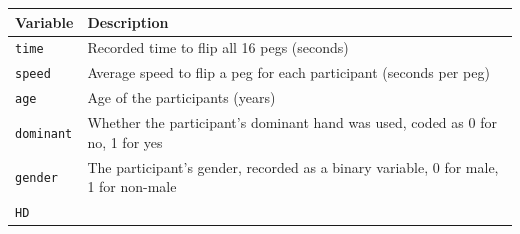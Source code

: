 \documentclass[
]{report}
\begin{document}
\begin{longtable}[]{@{}ll@{}}
\toprule
\begin{minipage}[b]{0.18\columnwidth}\raggedright
\textbf{Variable}\strut
\end{minipage} & \begin{minipage}[b]{0.76\columnwidth}\raggedright
\textbf{Description}\strut
\end{minipage}\tabularnewline
\midrule
\endhead
\begin{minipage}[t]{0.18\columnwidth}\raggedright
\texttt{time}\strut
\end{minipage} & \begin{minipage}[t]{0.76\columnwidth}\raggedright
Recorded time to flip all 16 pegs (seconds)\strut
\end{minipage}\tabularnewline
\begin{minipage}[t]{0.18\columnwidth}\raggedright
\texttt{speed}\strut
\end{minipage} & \begin{minipage}[t]{0.76\columnwidth}\raggedright
Average speed to flip a peg for each participant (seconds per peg)\strut
\end{minipage}\tabularnewline
\begin{minipage}[t]{0.18\columnwidth}\raggedright
\texttt{age}\strut
\end{minipage} & \begin{minipage}[t]{0.76\columnwidth}\raggedright
Age of the participants (years)\strut
\end{minipage}\tabularnewline
\begin{minipage}[t]{0.18\columnwidth}\raggedright
\texttt{dominant}\strut
\end{minipage} & \begin{minipage}[t]{0.76\columnwidth}\raggedright
Whether the participant's dominant hand was used, coded as 0 for no, 1 for yes\strut
\end{minipage}\tabularnewline
\begin{minipage}[t]{0.18\columnwidth}\raggedright
\texttt{gender}\strut
\end{minipage} & \begin{minipage}[t]{0.76\columnwidth}\raggedright
The participant's gender, recorded as a binary variable, 0 for male, 1 for non-male\strut
\end{minipage}\tabularnewline
\begin{minipage}[t]{0.18\columnwidth}\raggedright
\texttt{HD}\strut
\end{minipage} & \begin{minipage}[t]{0.76\columnwidth}\raggedright

\end{minipage}
\end{longtable}
\end{document}
